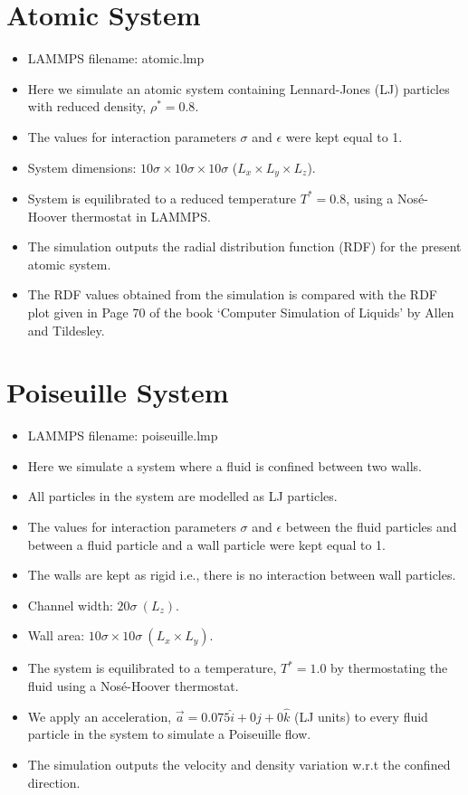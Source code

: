 \documentclass[12pt]{article}
\begin{document}
\newpage
\section{Atomic System}
\begin{itemize}
\item LAMMPS filename: atomic.lmp
\item Here we simulate an atomic system containing Lennard-Jones (LJ) particles with 
reduced density, $\rho^{*} = 0.8$.
\item The values for interaction parameters $\sigma$ and $\epsilon$ were kept equal to 1.
\item System dimensions: $10\sigma \times 10\sigma \times 10\sigma$ 
($L_{x} \times L_{y} \times L_{z}$).
\item System is equilibrated to a reduced temperature $T^{*} = 0.8$, 
using a Nos\'e-Hoover thermostat in LAMMPS.
\item The simulation outputs the radial distribution function (RDF) for the 
present atomic system.
\item The RDF values obtained from the simulation is compared with the RDF plot given 
in Page 70 of the book `Computer Simulation of Liquids' by Allen and Tildesley. 
\end{itemize}

\section{Poiseuille System}
\begin{itemize}
\item LAMMPS filename: poiseuille.lmp
\item Here we simulate a system where a fluid is confined between two walls.
\item All particles in the system are modelled as LJ particles.
\item The values for interaction parameters $\sigma$ and $\epsilon$ between the fluid particles 
and between a fluid particle and a wall particle were kept equal to 1.
\item The walls are kept as rigid i.e., there is no interaction between wall particles.
\item Channel width: $20\sigma \ (L_{z})$.
\item Wall area: $10\sigma \times 10\sigma \ (L_x \times L_y)$.
\item The system is equilibrated to a temperature, $T^* = 1.0$ by thermostating the fluid using a
Nos\'e-Hoover thermostat.
\item We apply an acceleration, $\vec{a} = 0.075\hat{i} + 0 \hat{j} + 0\hat{k}$ (LJ units) to 
every fluid particle in the system to simulate a Poiseuille flow.
\item The simulation outputs the velocity and density variation w.r.t the confined direction.
\end{itemize}
\end{document}
